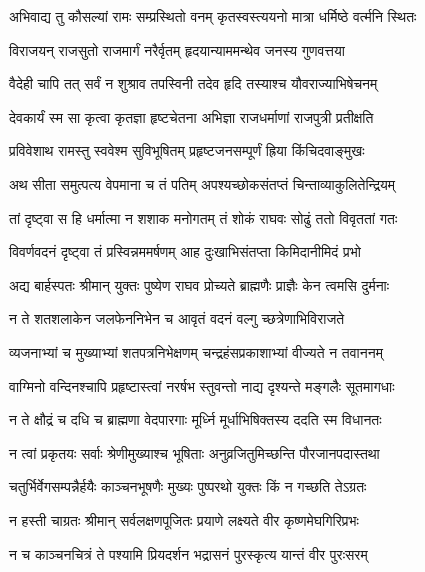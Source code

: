 
\twolineshloka
{अभिवाद्य तु कौसल्यां रामः सम्प्रस्थितो वनम्}
{कृतस्वस्त्ययनो मात्रा धर्मिष्ठे वर्त्मनि स्थितः} %

\twolineshloka
{विराजयन् राजसुतो राजमार्गं नरैर्वृतम्}
{हृदयान्याममन्थेव जनस्य गुणवत्तया} %

\twolineshloka
{वैदेही चापि तत् सर्वं न शुश्राव तपस्विनी}
{तदेव हृदि तस्याश्च यौवराज्याभिषेचनम्} %

\twolineshloka
{देवकार्यं स्म सा कृत्वा कृतज्ञा हृष्टचेतना}
{अभिज्ञा राजधर्माणां राजपुत्री प्रतीक्षति} %

\twolineshloka
{प्रविवेशाथ रामस्तु स्ववेश्म सुविभूषितम्}
{प्रहृष्टजनसम्पूर्णं ह्रिया किंचिदवाङ्मुखः} %

\twolineshloka
{अथ सीता समुत्पत्य वेपमाना च तं पतिम्}
{अपश्यच्छोकसंतप्तं चिन्ताव्याकुलितेन्द्रियम्} %

\twolineshloka
{तां दृष्ट्वा स हि धर्मात्मा न शशाक मनोगतम्}
{तं शोकं राघवः सोढुं ततो विवृततां गतः} %

\twolineshloka
{विवर्णवदनं दृष्ट्वा तं प्रस्विन्नममर्षणम्}
{आह दुःखाभिसंतप्ता किमिदानीमिदं प्रभो} %

\twolineshloka
{अद्य बार्हस्पतः श्रीमान् युक्तः पुष्येण राघव}
{प्रोच्यते ब्राह्मणैः प्राज्ञैः केन त्वमसि दुर्मनाः} %

\twolineshloka
{न ते शतशलाकेन जलफेननिभेन च}
{आवृतं वदनं वल्गु च्छत्रेणाभिविराजते} %

\twolineshloka
{व्यजनाभ्यां च मुख्याभ्यां शतपत्रनिभेक्षणम्}
{चन्द्रहंसप्रकाशाभ्यां वीज्यते न तवाननम्} %

\twolineshloka
{वाग्मिनो वन्दिनश्चापि प्रहृष्टास्त्वां नरर्षभ}
{स्तुवन्तो नाद्य दृश्यन्ते मङ्गलैः सूतमागधाः} %

\twolineshloka
{न ते क्षौद्रं च दधि च ब्राह्मणा वेदपारगाः}
{मूर्ध्नि मूर्धाभिषिक्तस्य ददति स्म विधानतः} %

\twolineshloka
{न त्वां प्रकृतयः सर्वाः श्रेणीमुख्याश्च भूषिताः}
{अनुव्रजितुमिच्छन्ति पौरजानपदास्तथा} %

\twolineshloka
{चतुर्भिर्वेगसम्पन्नैर्हयैः काञ्चनभूषणैः}
{मुख्यः पुष्परथो युक्तः किं न गच्छति तेऽग्रतः} %

\twolineshloka
{न हस्ती चाग्रतः श्रीमान् सर्वलक्षणपूजितः}
{प्रयाणे लक्ष्यते वीर कृष्णमेघगिरिप्रभः} %

\twolineshloka
{न च काञ्चनचित्रं ते पश्यामि प्रियदर्शन}
{भद्रासनं पुरस्कृत्य यान्तं वीर पुरःसरम्} %

